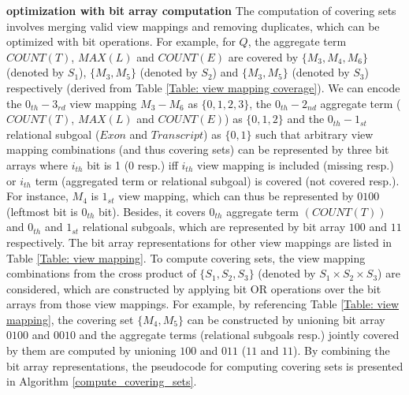 \textbf{optimization with bit array computation} The computation of covering sets involves merging valid view mappings and removing duplicates, which can be optimized with bit operations. For example, for $Q$, the aggregate term $COUNT(T)$, $MAX(L)$ and $COUNT(E)$ are covered by $\{M_3, M_4, M_6\}$ (denoted by $S_1$), $\{M_3, M_5\}$ (denoted by $S_2$) and $\{M_3, M_5\}$ (denoted by $S_3$) respectively (derived from Table \ref{Table: view mapping coverage}). We can encode the $0_{th}-3_{rd}$ view mapping $M_3-M_6$ as $\{0,1,2,3\}$, the $0_{th}-2_{nd}$ aggregate term ($COUNT(T)$, $MAX(L)$ and $COUNT(E)$) as $\{0, 1, 2\}$ and the $0_{th}-1_{st}$ relational subgoal ($Exon$ and $Transcript$) as $\{0, 1\}$ such that arbitrary view mapping combinations (and thus covering sets) can be represented by three bit arrays where $i_{th}$ bit is 1 (0 resp.) iff $i_{th}$ view mapping is included (missing resp.) or $i_{th}$ term (aggregated term or relational subgoal) is covered (not covered resp.). For instance, $M_4$ is $1_{st}$ view mapping, which can thus be represented by $0100$ (leftmost bit is $0_{th}$ bit). Besides, it covers $0_{th}$ aggregate term $(COUNT(T))$ and $0_{th}$ and $1_{st}$ relational subgoals, which are represented by bit array $100$ and $11$ respectively. The bit array representations for other view mappings are listed in Table \ref{Table: view mapping}. To compute covering sets, the view mapping combinations from the cross product of $\{S_1, S_2, S_3\}$ (denoted by $S_1 \times S_2 \times S_3$) are considered, which are constructed by applying bit OR operations over the bit arrays from those view mappings. For example, by referencing Table \ref{Table: view mapping}, the covering set $\{M_4, M_5\}$ can be constructed by unioning bit array $0100$ and $0010$ and the aggregate terms (relational subgoals resp.) jointly covered by them are computed by unioning $100$ and $011$ ($11$ and $11$). By combining the bit array representations, the pseudocode for computing covering sets is presented in Algorithm \ref{compute_covering_sets}.

